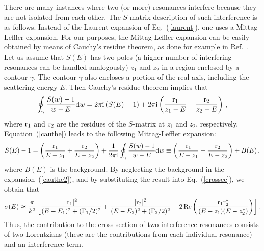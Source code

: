 \documentclass[12pt]{article}
\newcommand{\rmi}{{\rm i}}
\newcommand{\rmd}{{\rm d}}
\begin{document}
There are many instances where two (or more) resonances interfere 
because they are not isolated from each other. The $S$-matrix description
of such interference is as follows. Instead of the Laurent expansion
of Eq.~(\ref{laurent}), one uses a Mittag-Leffler expansion. For our
purposes, the Mittag-Leffler expansion can be easily obtained by means
of Cauchy's residue theorem, as done for example in 
Ref.~\cite{ELANDER1}. Let us assume 
that $S(E)$ has two poles (a higher number of interfering resonances can 
be handled analogously) $z_1$ and $z_2$ in a region enclosed by a contour
$\gamma$. The contour $\gamma$ also encloses a portion of the real axis, 
including the scattering energy $E$. Then Cauchy's residue theorem implies that
\begin{equation}
        \oint_{\gamma} \frac{S(w)-1}{w-E} \rmd w =
       2\pi \rmi \left( S(E)-1 \right) 
        + 2\pi \rmi \left( \frac{{\rm r}_1}{z_1-E} +
           \frac{{\rm r}_2}{z_2-E}    \right) \, , 
         \label{cauthe}
\end{equation}
where ${\rm r}_1$ and ${\rm r}_2$ are the residues of the $S$-matrix at 
$z_1$ and $z_2$, respectively. Equation~(\ref{cauthe}) leads to the following
Mittag-Leffler expansion:
\begin{equation}
       S(E)-1= \left( \frac{{\rm r}_1}{E-z_1} +
           \frac{{\rm r}_2}{E-z_2} \right) + \frac{1}{2\pi \rmi}
         \oint_{\gamma} \frac{S(w)-1}{w-E} \rmd w \equiv
        \left( \frac{{\rm r}_1}{E-z_1} +
           \frac{{\rm r}_2}{E-z_2} \right) + B(E) \, ,
         \label{cauthe2}
\end{equation}
where $B(E)$ is the background. By neglecting the background
in the expansion~(\ref{cauthe2}), and by substituting the result into 
Eq.~(\ref{crossec}), we obtain that
\begin{equation}
      \sigma (E)\approx \frac{\pi}{k^2}
     \left[ 
\frac{|{\rm r}_1|^2}{(E-E_1)^2+(\Gamma _1 /2)^2}
+ \frac{|{\rm r}_2|^2}{(E-E_2)^2+(\Gamma _2 /2)^2}
+2\, \text{Re} \left( \frac{{\rm r}_1{\rm r}_2^*}{(E-z_1)(E-z_2^*)}\right)
\right] .
       \label{crossecinter}
\end{equation}
Thus, the contribution to the cross section of two interference resonances
consists of two Lorentzians (these are the contributions from
each individual resonance) and an interference term.
\end{document}
